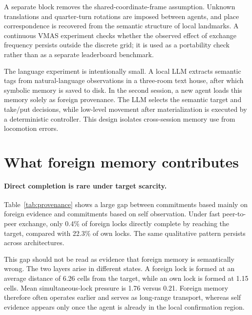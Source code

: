 \documentclass{article}
\begin{document}
A separate block removes the shared-coordinate-frame assumption. Unknown translations and quarter-turn rotations are imposed between agents, and place correspondence is recovered from the semantic structure of local landmarks. A continuous VMAS experiment checks whether the observed effect of exchange frequency persists outside the discrete grid; it is used as a portability check rather than as a separate leaderboard benchmark.

The language experiment is intentionally small. A local LLM extracts semantic tags from natural-language observations in a three-room text house, after which symbolic memory is saved to disk. In the second session, a new agent loads this memory solely as foreign provenance. The LLM selects the semantic target and take/put decisions, while low-level movement after materialization is executed by a deterministic controller. This design isolates cross-session memory use from locomotion errors.

\section{What foreign memory contributes}

\paragraph{Direct completion is rare under target scarcity.}
Table~\ref{tab:provenance} shows a large gap between commitments based mainly on foreign evidence and commitments based on self observation. Under fast peer-to-peer exchange, only 0.4\% of foreign locks directly complete by reaching the target, compared with 22.3\% of own locks. The same qualitative pattern persists across architectures.

This gap should not be read as evidence that foreign memory is semantically wrong. The two layers arise in different states. A foreign lock is formed at an average distance of 6.26 cells from the target, while an own lock is formed at 1.15 cells. Mean simultaneous-lock pressure is 1.76 versus 0.21. Foreign memory therefore often operates earlier and serves as long-range transport, whereas self evidence appears only once the agent is already in the local confirmation region.
\end{document}
